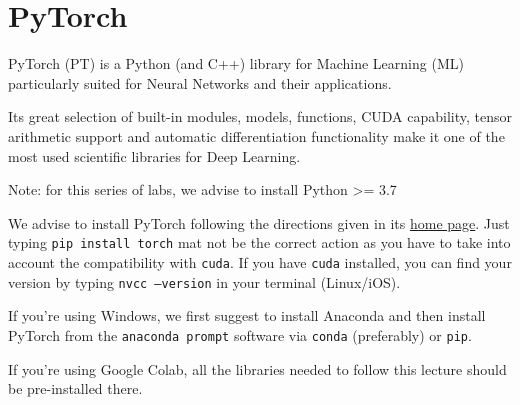 
\chapter{PyTorch}

PyTorch (PT) is a Python (and C++) library for Machine Learning (ML) particularly suited for Neural Networks and their applications.

Its great selection of built-in modules, models, functions, CUDA capability, tensor arithmetic support and automatic differentiation functionality make it one of the most used scientific libraries for Deep Learning.

Note: for this series of labs, we advise to install Python >= 3.7



We advise to install PyTorch following the directions given in its \href{https://pytorch.org/get-started/locally/}{home page}. Just typing \texttt{pip install torch} mat not be the correct action as you have to take into account the compatibility with \texttt{cuda}. If you have \texttt{cuda} installed, you can find your version by typing \texttt{nvcc --version} in your terminal (Linux/iOS).

If you're using Windows, we first suggest to install Anaconda and then install PyTorch from the \texttt{anaconda prompt} software via \texttt{conda} (preferably) or \texttt{pip}.

If you're using Google Colab, all the libraries needed to follow this lecture should be pre-installed there.

